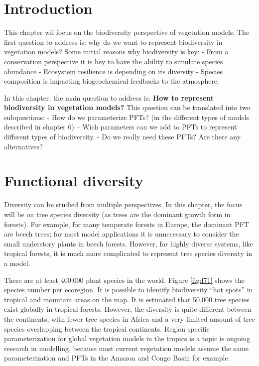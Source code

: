 \documentclass[12pt,oneside]{book}
\begin{document}

\section{Introduction}\label{introduction-3}

This chapter wil focus on the biodiversity perspective of vegetation
models. The first question to address is: why do we want to represent
biodiversity in vegetation models? Some initial reasons why biodiversity
is key: - From a conservation perspective it is hey to have the ability
to simulate species abundance - Ecosystem resilience is depending on its
diversity - Species composition is impacting biogeochemical feedbacks to
the atmosphere.

In this chapter, the main question to address is: \textbf{How to
represent biodiversity in vegetation models?} This question can be
translated into two subquestions: - How do we parameterize PFTs? (in the
different types of models described in chapter 6) -- Wich parameters can
we add to PFTs to represent different types of biodiversity. - Do we
really need these PFTs? Are there any alternatives?

\section{Functional diversity}\label{functional-diversity}

Diversity can be studied from multiple perspectives. In this chapter,
the focus will be on tree species diversity (as trees are the dominant
growth form in forests). For example, for many temperate forests in
Europe, the dominant PFT are beech trees; for most model applications it
is unnecessary to consider the small understory plants in beech forests.
However, for highly diverse systems, like tropical forests, it is much
more complicated to represent tree species diversity in a model.

There are at least 400.000 plant species in the world. Figure
\ref{fig:f71} shows the species number per ecoregion. It is possible to
identify biodiversity ``hot spots'' in tropical and mountain areas on
the map. It is estimated that 50.000 tree species exist globally in
tropical forests. However, the diversity is quite different between the
continents, with fewer tree species in Africa and a very limited amount
of tree species overlapping between the tropical continents. Region
specific parameterization for global vegetation models in the tropics is
a topic is ongoing research in modelling, because most current
vegetation models assume the same parameterization and PFTs in the
Amazon and Congo Basin for example.
\end{document}
